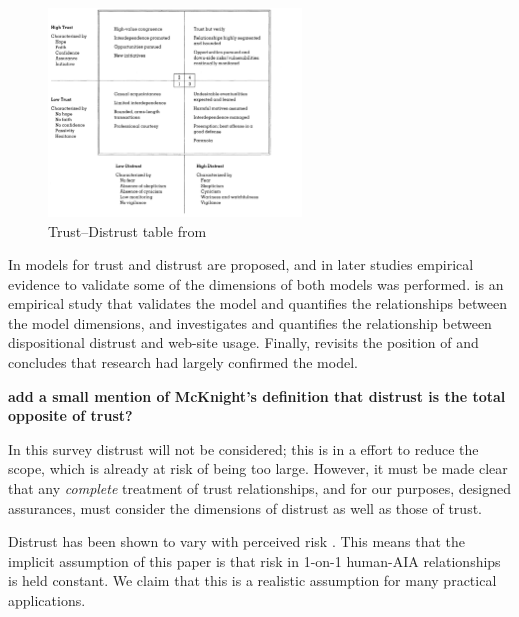         \begin{figure}[!htbp]
            \centering
            \includegraphics[width=0.6\textwidth]{Figures/distrust_table}
            \caption{Trust--Distrust table from \cite{Lewicki1998-ox}}
            \label{fig:distrust_table}
        \end{figure}

        In \citet{McKnight2001-gz} models for trust and distrust are proposed, and in later studies empirical evidence to validate some of the dimensions of both models was performed. \citet{McKnight2002-qx} is an empirical study that validates the model and quantifies the relationships between the model dimensions, and \citet{McKnight2004-vv} investigates and quantifies the relationship between dispositional distrust and web-site usage. Finally, \citet{McKnight2006-ce} revisits the position of \citet{McKnight1998-ty} and concludes that research had largely confirmed the model.

        \textbf{add a small mention of McKnight's definition that distrust is the total opposite of trust?}

        In this survey distrust will not be considered; this is in a effort to reduce the scope, which is already at risk of being too large. However, it must be made clear that any \emph{complete} treatment of trust relationships, and for our purposes, designed assurances, must consider the dimensions of distrust as well as those of trust. 
        
        Distrust has been shown to vary with perceived risk \cite{McKnight2004-vv}. This means that the implicit assumption of this paper is that risk in 1-on-1 human-AIA relationships is held constant. We claim that this is a realistic assumption for many practical applications.
